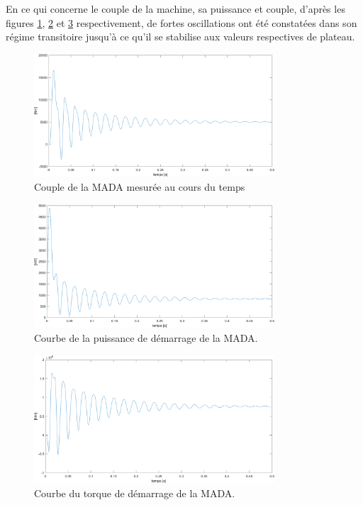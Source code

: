 En ce qui concerne le couple de la machine, sa puissance et couple, d'après les figures \ref{img-simuMADA-Ce}, \ref{img-simuMADA-P} et \ref{img-simuMADA-torque} respectivement, de fortes oscillations ont été constatées dans son régime transitoire jusqu'à ce qu'il se stabilise aux valeurs respectives de plateau.


\begin{figure}[!h]
    \centering
    \includegraphics[width=0.8\textwidth]{simusMATLAB/MADA/Ce.png} 
    \caption{Couple de la MADA mesurée au cours du temps}
    \label{img-simuMADA-Ce}
\end{figure}


\begin{figure}[!h]
    \centering
    \includegraphics[width=0.8\textwidth]{simusMATLAB/MADA/P.png} 
    \caption{Courbe de la puissance de démarrage de la MADA.}
    \label{img-simuMADA-P}
\end{figure}


\begin{figure}[!h]
    \centering
    \includegraphics[width=0.8\textwidth]{simusMATLAB/MADA/torque.png} 
    \caption{Courbe du torque de démarrage de la MADA.}
    \label{img-simuMADA-torque}
\end{figure}


